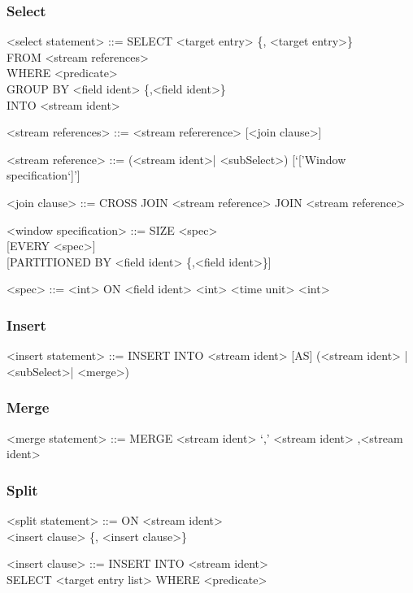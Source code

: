 \subsubsection{Select}
\begin{grammar}
<select statement> ::= SELECT <target entry> \{, <target entry>\}\\
	FROM <stream references> \\
	WHERE <predicate> \\
	GROUP BY <field ident> \{,<field ident>\} \\
	INTO <stream ident>
	
<stream references> ::= <stream refererence> [<join clause>]

<stream reference> ::= (<stream ident>| <subSelect>) [`['Window specification`]']

<join clause> ::= CROSS JOIN <stream reference>
				\alt [INNER] JOIN <stream reference>

<window specification> ::= 
								SIZE <spec> \\
								{ }[EVERY <spec>]\\
								{ }[PARTITIONED BY <field ident> \{,<field ident>\}]

<spec> ::= <int> ON <field ident>
			\alt <int> <time unit>
			\alt <int>
\end{grammar}


\subsubsection{Insert}

\begin{grammar}
<insert statement> ::= INSERT INTO <stream ident> [AS] 
							(<stream ident> | <subSelect>| <merge>)
\end{grammar}


\subsubsection{Merge}
\begin{grammar}
<merge statement> ::= MERGE <stream ident> `,' <stream ident> {,<stream ident>}
\end{grammar}

\subsubsection{Split}
\begin{grammar}
<split statement> ::= ON <stream ident> \\
						<insert clause> \{, <insert clause>\}
						
<insert clause> ::= INSERT INTO <stream ident> \\SELECT <target entry list> WHERE <predicate>
\end{grammar}

